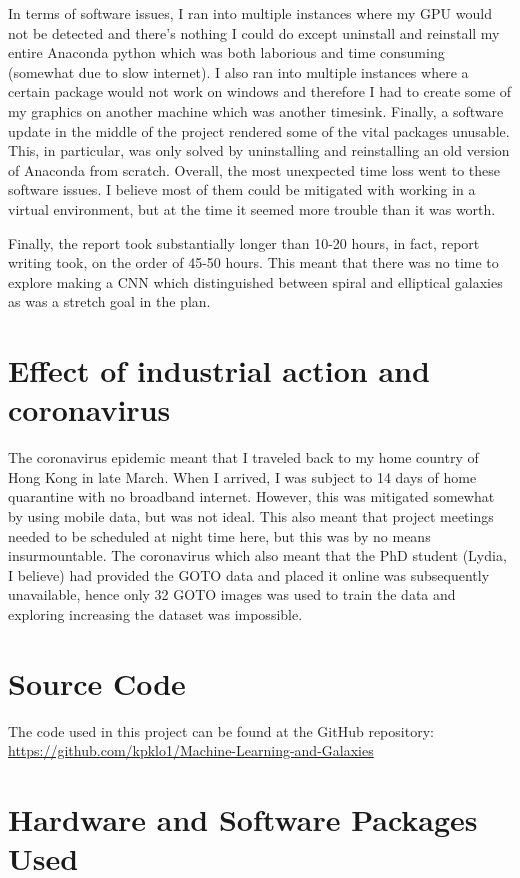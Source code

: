 \documentclass[a4paper,fleqn,usenatbib]{mnras}
\begin{document}
In terms of software issues, I ran into multiple instances where my GPU would not be detected and there's nothing I could do except uninstall and reinstall my entire Anaconda python which was both laborious and time consuming (somewhat due to slow internet). I also ran into multiple instances where a certain package would not work on windows and therefore I had to create some of my graphics on another machine which was another timesink. Finally, a software update in the middle of the project rendered some of the vital packages unusable. This, in particular, was only solved by uninstalling and reinstalling an old version of Anaconda from scratch. Overall, the most unexpected time loss went to these software issues. I believe most of them could be mitigated with working in a virtual environment, but at the time it seemed more trouble than it was worth. 

Finally, the report took substantially longer than 10-20 hours, in fact, report writing took, on the order of 45-50 hours. This meant that there was no time to explore making a CNN which distinguished between spiral and elliptical galaxies as was a stretch goal in the plan.
\section{Effect of industrial action and coronavirus}
\label{2020 special}
The coronavirus epidemic meant that I traveled back to my home country of Hong Kong in late March. When I arrived, I was subject to 14 days of home quarantine with no broadband internet. However, this was mitigated somewhat by using mobile data, but was not ideal. This also meant that project meetings needed to be scheduled at night time here, but this was by no means insurmountable. The coronavirus which also meant that the PhD student (Lydia, I believe) had provided the GOTO data and placed it online was subsequently unavailable, hence only 32 GOTO images was used to train the data and exploring increasing the dataset was impossible. 


\section{Source Code}
\label{Code}
The code used in this project can be found at the GitHub repository: \url{https://github.com/kpklo1/Machine-Learning-and-Galaxies}

\section{Hardware and Software Packages Used}
\label{HSWare}
\end{document}
